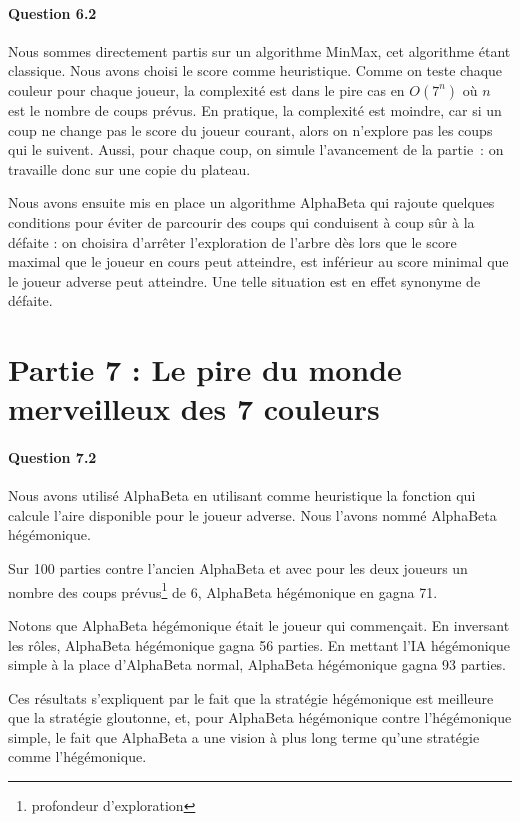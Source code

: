 \documentclass[a4paper]{article}
\begin{document}
    \paragraph{Question 6.2} Nous sommes directement partis sur un algorithme 
MinMax, cet algorithme étant classique. Nous avons choisi le score comme
    heuristique. Comme on teste chaque couleur pour chaque joueur, la complexité
    est dans le pire cas en $O(7^n)$ où $n$ est le nombre de coups prévus. En 
pratique, la complexité est moindre, car si un coup ne change pas le score du 
joueur courant, alors on n'explore pas les coups qui le suivent. 
Aussi, pour chaque coup, on simule l'avancement de la partie~: on travaille 
donc sur une copie du plateau. 

Nous avons ensuite mis en place un algorithme AlphaBeta qui rajoute quelques 
conditions pour éviter de parcourir des coups qui conduisent à coup sûr à la 
défaite : on choisira d'arrêter l'exploration de l'arbre dès lors que le score 
maximal que le joueur en cours peut atteindre, est inférieur au score minimal 
que le joueur adverse peut atteindre. Une telle situation est en effet synonyme 
de défaite.


    \section{Partie 7 : Le pire du monde merveilleux des 7 couleurs}
    \paragraph{Question 7.2} Nous avons utilisé AlphaBeta en utilisant comme
    heuristique la fonction qui calcule l'aire disponible pour le joueur
    adverse. Nous l'avons nommé AlphaBeta hégémonique.
    
    Sur 100 parties contre l'ancien AlphaBeta et avec pour les
    deux joueurs un nombre des coups prévus\footnote{profondeur d'exploration} 
de 6, AlphaBeta hégémonique en gagna 71. 

Notons que AlphaBeta hégémonique était le joueur qui commençait. En 
inversant les rôles, AlphaBeta hégémonique gagna 56 parties. En mettant l'IA 
hégémonique simple à la place d'AlphaBeta normal, AlphaBeta hégémonique gagna 93 
parties.

Ces résultats s'expliquent par le fait que la stratégie hégémonique est 
meilleure que la stratégie gloutonne, et, pour AlphaBeta hégémonique contre 
l'hégémonique simple, le fait que AlphaBeta a une vision à plus long terme 
qu'une stratégie comme l'hégémonique.
\end{document}
